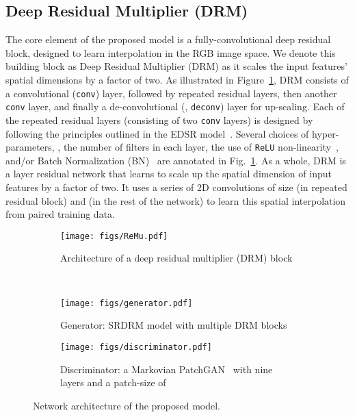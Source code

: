 \documentclass[10pt,twocolumn,letterpaper]{article}
\begin{document}
\subsection{Deep Residual Multiplier (DRM)}
The core element of the proposed model is a fully-convolutional deep residual block, designed to learn  interpolation in the RGB image space. We denote this building block as Deep Residual Multiplier (DRM) as it scales the input features' spatial dimensions by a factor of two. As illustrated in Figure~\ref{fig:model_drm}, DRM consists of a convolutional ({\tt conv}) layer, followed by  repeated residual layers, then another {\tt conv} layer, and finally a de-convolutional (\ie, {\tt deconv}) layer for up-scaling.
Each of the repeated residual layers (consisting of two {\tt conv} layers) is designed by following the principles outlined in the EDSR model~\cite{lim2017enhanced}. 
Several choices of hyper-parameters, \eg, the number of filters in each layer, the use of {\tt ReLU} non-linearity~\cite{nair2010rectified}, and/or Batch Normalization (BN)~\cite{ioffe2015batch} are annotated in Fig.~\ref{fig:model_drm}. As a whole, DRM is a  layer residual network that learns to scale up the spatial dimension of input features by a factor of two. It uses a series of 2D convolutions of size  (in repeated residual block) and  (in the rest of the network) to learn this spatial interpolation from paired training data.      


\begin{figure*}[t]
	\centering
	\begin{subfigure}{0.43\textwidth}
		\texttt{[image: figs/ReMu.pdf]}
\caption{Architecture of a deep residual multiplier (DRM) block}
		\label{fig:model_drm}
	\end{subfigure}~
	\begin{subfigure}{0.48\textwidth}
		\texttt{[image: figs/generator.pdf]}
		\caption{Generator: SRDRM model with multiple DRM blocks}
		\label{fig:model_srdrm}
	\end{subfigure}
	
	\vspace{1mm}
	\begin{subfigure}{0.92\textwidth}
		\texttt{[image: figs/discriminator.pdf]}
\caption{Discriminator: a Markovian PatchGAN~\cite{isola2017image} with nine layers and a patch-size of }
		\label{fig:model_srdrmgan}
	\end{subfigure}
\caption{Network architecture of the proposed model.}
	\vspace{-2mm}
	\label{fig:model}
\end{figure*}
\end{document}
